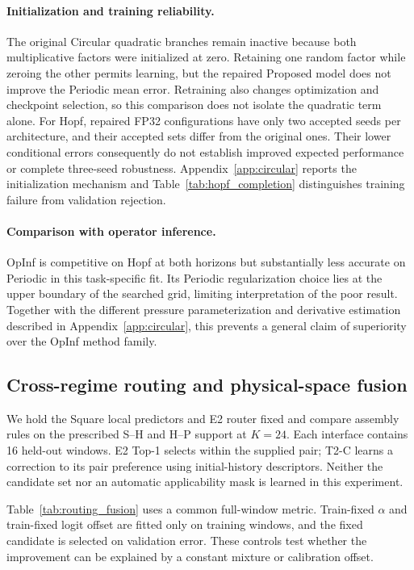 \paragraph{Initialization and training reliability.}
The original Circular quadratic branches remain inactive because
both multiplicative factors were initialized at zero.
Retaining one random factor while zeroing the other permits learning,
but the repaired Proposed model does not improve the Periodic mean
error. Retraining also changes optimization and checkpoint selection,
so this comparison does not isolate the quadratic term alone.
For Hopf, repaired FP32 configurations have only two accepted seeds
per architecture, and their accepted sets differ from the original
ones. Their lower conditional errors consequently do not establish
improved expected performance or complete three-seed robustness.
Appendix~\ref{app:circular} reports the initialization mechanism and
Table~\ref{tab:hopf_completion} distinguishes training failure from
validation rejection.

\paragraph{Comparison with operator inference.}
OpInf is competitive on Hopf at both horizons but substantially less
accurate on Periodic in this task-specific fit.
Its Periodic regularization choice lies at the upper boundary of the
searched grid, limiting interpretation of the poor result.
Together with the different pressure parameterization and derivative
estimation described in Appendix~\ref{app:circular}, this prevents
a general claim of superiority over the OpInf method family.

\subsection{Cross-regime routing and physical-space fusion}
\label{sec:exp_fusion}

We hold the Square local predictors and E2 router fixed and compare
assembly rules on the prescribed S--H and H--P support at $K=24$.
Each interface contains 16 held-out windows.
E2 Top-1 selects within the supplied pair; T2-C learns a correction
to its pair preference using initial-history descriptors.
Neither the candidate set nor an automatic applicability mask is
learned in this experiment.

Table~\ref{tab:routing_fusion} uses a common full-window metric.
Train-fixed $\alpha$ and train-fixed logit offset are fitted only
on training windows, and the fixed candidate is selected on
validation error. These controls test whether the improvement
can be explained by a constant mixture or calibration offset.

